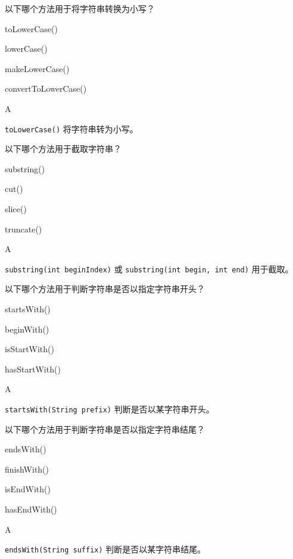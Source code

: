 \begin{question}
	以下哪个方法用于将字符串转换为小写？
	\begin{options}
		\item toLowerCase()
		\item lowerCase()
		\item makeLowerCase()
		\item convertToLowerCase()
	\end{options}
	\begin{answer}
		A
	\end{answer}
	\begin{explanation}
		\texttt{toLowerCase()} 将字符串转为小写。
	\end{explanation}
\end{question}

\begin{question}
	以下哪个方法用于截取字符串？
	\begin{options}
		\item substring()
		\item cut()
		\item slice()
		\item truncate()
	\end{options}
	\begin{answer}
		A
	\end{answer}
	\begin{explanation}
		\texttt{substring(int beginIndex)} 或 \texttt{substring(int begin, int end)} 用于截取。
	\end{explanation}
\end{question}

\begin{question}
	以下哪个方法用于判断字符串是否以指定字符串开头？
	\begin{options}
		\item startsWith()
		\item beginWith()
		\item isStartWith()
		\item hasStartWith()
	\end{options}
	\begin{answer}
		A
	\end{answer}
	\begin{explanation}
		\texttt{startsWith(String prefix)} 判断是否以某字符串开头。
	\end{explanation}
\end{question}

\begin{question}
	以下哪个方法用于判断字符串是否以指定字符串结尾？
	\begin{options}
		\item endsWith()
		\item finishWith()
		\item isEndWith()
		\item hasEndWith()
	\end{options}
	\begin{answer}
		A
	\end{answer}
	\begin{explanation}
		\texttt{endsWith(String suffix)} 判断是否以某字符串结尾。
	\end{explanation}
\end{question}


